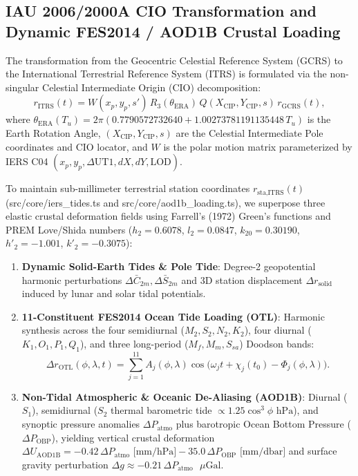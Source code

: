 \documentclass[11pt,a4paper,reqno]{article}
\def\bm#1{#1}%
\def\texttt#1{#1}%
\theoremstyle{plain}
\theoremstyle{definition}
\theoremstyle{remark}
\numberwithin{equation}{section}
\begin{document}
\subsection{IAU 2006/2000A CIO Transformation and Dynamic FES2014 / AOD1B Crustal Loading}
The transformation from the Geocentric Celestial Reference System (GCRS) to the International Terrestrial Reference System (ITRS) is formulated via the non-singular Celestial Intermediate Origin (CIO) decomposition:
\begin{equation}
  \bm{r}_{\text{ITRS}}(t) = \bm{W}(x_p, y_p, s')\,\bm{R}_3(\theta_{\text{ERA}})\,\bm{Q}(X_{\text{CIP}}, Y_{\text{CIP}}, s)\,\bm{r}_{\text{GCRS}}(t),
  \label{eq:cio_transform}
\end{equation}
where $\theta_{\text{ERA}}(T_u) = 2\pi(0.7790572732640 + 1.00273781191135448\,T_u)$ is the Earth Rotation Angle, $(X_{\text{CIP}}, Y_{\text{CIP}}, s)$ are the Celestial Intermediate Pole coordinates and CIO locator, and $\bm{W}$ is the polar motion matrix parameterized by IERS C04 $(x_p, y_p, \Delta\text{UT1}, dX, dY, \text{LOD})$.

To maintain sub-millimeter terrestrial station coordinates $\bm{r}_{\text{sta},\text{ITRS}}(t)$ (\texttt{src/core/iers\_tides.ts} and \texttt{src/core/aod1b\_loading.ts}), we superpose three elastic crustal deformation fields using Farrell's (1972) Green's functions and PREM Love/Shida numbers ($h_2 = 0.6078$, $l_2 = 0.0847$, $k_{20} = 0.30190$, $h'_2 = -1.001$, $k'_2 = -0.3075$):
\begin{enumerate}[leftmargin=1.8em,itemsep=2pt]
  \item \textbf{Dynamic Solid-Earth Tides \& Pole Tide}: Degree-2 geopotential harmonic perturbations $\Delta\bar{C}_{2m}, \Delta\bar{S}_{2m}$ and 3D station displacement $\Delta\bm{r}_{\text{solid}}$ induced by lunar and solar tidal potentials.
  \item \textbf{11-Constituent FES2014 Ocean Tide Loading (OTL)}: Harmonic synthesis across the four semidiurnal ($M_2, S_2, N_2, K_2$), four diurnal ($K_1, O_1, P_1, Q_1$), and three long-period ($M_f, M_m, S_{sa}$) Doodson bands:
  \begin{equation}
    \Delta\bm{r}_{\text{OTL}}(\phi, \lambda, t) = \sum_{j=1}^{11} \bm{A}_j(\phi, \lambda) \cos\!\big(\omega_j t + \chi_j(t_0) - \bm{\Phi}_j(\phi, \lambda)\big).
    \label{eq:fes2014_otl}
  \end{equation}
  \item \textbf{Non-Tidal Atmospheric \& Oceanic De-Aliasing (AOD1B)}: Diurnal ($S_1$), semidiurnal ($S_2$ thermal barometric tide $\propto 1.25\cos^3\phi\text{ hPa}$), and synoptic pressure anomalies $\Delta P_{\text{atmo}}$ plus barotropic Ocean Bottom Pressure ($\Delta P_{\text{OBP}}$), yielding vertical crustal deformation $\Delta U_{\text{AOD1B}} = -0.42\,\Delta P_{\text{atmo}}\text{ [mm/hPa]} - 35.0\,\Delta P_{\text{OBP}}\text{ [mm/dbar]}$ and surface gravity perturbation $\Delta g \approx -0.21\,\Delta P_{\text{atmo}}\text{ }\mu\text{Gal}$.
\end{enumerate}
\end{document}
